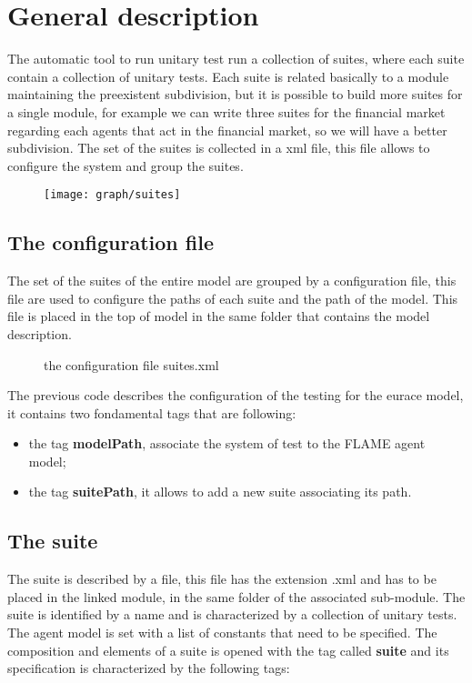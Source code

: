\documentclass[a4paper,10pt]{article}
\begin{document}
\section{General description}
The automatic tool to run unitary test run a collection of suites, 
where each suite contain a collection of unitary tests. 
Each suite is related basically to a module maintaining the preexistent subdivision, but it is possible to build more suites  for a single module, for example we can write three suites for the financial market regarding each agents that act in the financial market, so we will have a better subdivision. The set of the suites is collected in a xml file, this file allows to configure the system and group the suites.   
\begin{figure}
\centering
\texttt{[image: graph/suites]} 
\end{figure}
\subsection{The configuration file}
The set of the suites of the entire model are grouped by a configuration file, this file are used to configure the paths of each suite and the path of the model. This file is placed in the top of model in the same folder that contains the model description.
\begin{figure}
\label{fig:fig2}

\caption{the configuration file suites.xml}
\end{figure} 
The previous code describes the configuration of the testing for the eurace model, it contains two fondamental tags that are following:
\begin{itemize}
\item the tag \textbf{modelPath}, associate the system of test to the FLAME agent model;
\item the tag \textbf{suitePath}, it allows to add a new suite associating its path.
\end{itemize}
\subsection{The suite}
The suite is described by a file, this file has the extension .xml and  has to be placed in the linked module, in the same folder of the associated sub-module. The suite is identified by a name and is characterized by a collection of unitary tests. The agent model is set with a list of constants that need to be specified.
The composition and elements of a suite is opened with the tag called \textbf{suite} and its specification is characterized by the following tags:
\end{document}
